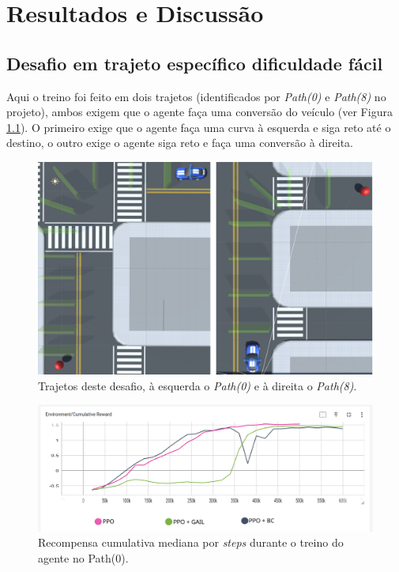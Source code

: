 \chapter{Resultados e Discussão}\label{cap:resultados}

\section{Desafio em trajeto específico dificuldade fácil}
Aqui o treino foi feito em dois trajetos (identificados por \textit{Path(0)} e \textit{Path(8)} no projeto), ambos exigem que o agente faça uma conversão do veículo (ver Figura \ref{fig:trajetos-desafio-facil}). O primeiro exige que o agente faça uma curva à esquerda e siga reto até o destino, o outro exige o agente siga reto e faça uma conversão à direita.

\begin{figure}[h]
    \centering
    \includegraphics{figs/treinos/desafio-mediano/paths_0-8.png}
    \caption{Trajetos deste desafio, à esquerda o \textit{Path(0)} e à direita o \textit{Path(8)}.}
    \label{fig:trajetos-desafio-facil}
\end{figure}

\begin{figure}[h]
    \centering
    \includegraphics[scale=0.42]{figs/treinos/desafio-mediano/path0/recompensa-ppo-bc-gail-path0.png}
    \caption{Recompensa cumulativa mediana por \textit{steps} durante o treino do agente no \textit{} Path(0).}
    \label{fig:result-desafio-1-path-0}
\end{figure}


